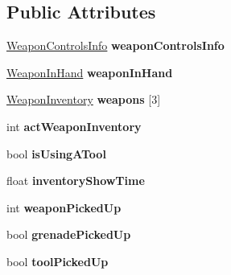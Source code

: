\subsection*{\-Public \-Attributes}
\begin{DoxyCompactItemize}
\item 
\hypertarget{classComponentPlayer_ab0e6d89577ef6bd713c8259b572066f7}{
\hyperlink{classWeaponControlsInfo}{\-Weapon\-Controls\-Info} {\bfseries weapon\-Controls\-Info}}
\label{d5/d28/classComponentPlayer_ab0e6d89577ef6bd713c8259b572066f7}

\item 
\hypertarget{classComponentPlayer_a41250c89951c3c79c9e35fa007986cd3}{
\hyperlink{classWeaponInHand}{\-Weapon\-In\-Hand} {\bfseries weapon\-In\-Hand}}
\label{d5/d28/classComponentPlayer_a41250c89951c3c79c9e35fa007986cd3}

\item 
\hypertarget{classComponentPlayer_adc0824c1a2a9c04bce0dbb795569f60e}{
\hyperlink{classWeaponInventory}{\-Weapon\-Inventory} {\bfseries weapons} \mbox{[}3\mbox{]}}
\label{d5/d28/classComponentPlayer_adc0824c1a2a9c04bce0dbb795569f60e}

\item 
\hypertarget{classComponentPlayer_a519e3e128c11dfc2567c0c397b493acf}{
int {\bfseries act\-Weapon\-Inventory}}
\label{d5/d28/classComponentPlayer_a519e3e128c11dfc2567c0c397b493acf}

\item 
\hypertarget{classComponentPlayer_af6035a7a4805d61f6121847395c57f9c}{
bool {\bfseries is\-Using\-A\-Tool}}
\label{d5/d28/classComponentPlayer_af6035a7a4805d61f6121847395c57f9c}

\item 
\hypertarget{classComponentPlayer_a1f4dc283de36244d3a137d5129185167}{
float {\bfseries inventory\-Show\-Time}}
\label{d5/d28/classComponentPlayer_a1f4dc283de36244d3a137d5129185167}

\item 
\hypertarget{classComponentPlayer_a798a9b9a661f388b2fac3bef27bfcf5f}{
int {\bfseries weapon\-Picked\-Up}}
\label{d5/d28/classComponentPlayer_a798a9b9a661f388b2fac3bef27bfcf5f}

\item 
\hypertarget{classComponentPlayer_abbc5bdda4ee78cfe86163c4f36eff6dc}{
bool {\bfseries grenade\-Picked\-Up}}
\label{d5/d28/classComponentPlayer_abbc5bdda4ee78cfe86163c4f36eff6dc}

\item 
\hypertarget{classComponentPlayer_a04b39f8bcb3d7268f14b10f5566dce82}{
bool {\bfseries tool\-Picked\-Up}}
\label{d5/d28/classComponentPlayer_a04b39f8bcb3d7268f14b10f5566dce82}


\end{DoxyCompactItemize}
